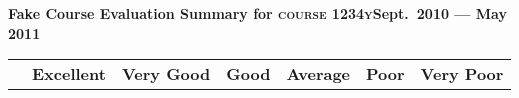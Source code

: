 \documentclass[12pt, oneside, landscape]{memoir}
\newcommand{\cheading}[2]{\textbf{#1\hfill #2}}
\newcommand{\cheading}[2]{\textcolor{Maroon}{\textbf{#1\hfill #2}}}
\begin{document}
\thispagestyle{empty}
\parindent0pt
%

\cheading{Fake Course Evaluation Summary for \textsc{course
		1234y}}{Sept.\ 2010 --- May 2011}

\begin{longtable}{@{}l rr rr rr rr rr rr}

	\toprule%
	\centering%
	                                             & \multicolumn{2}{c}{{{\bfseries Excellent}}}
	                                             & \multicolumn{2}{c}{{{\bfseries Very Good}}}
	                                             & \multicolumn{2}{c}{{{\bfseries Good}}}
	                                             & \multicolumn{2}{c}{{{\bfseries Average}}}
	                                             & \multicolumn{2}{c}{{{\bfseries Poor}}}
	                                             & \multicolumn{2}{c}{{{\bfseries Very Poor}}} \

	\cmidrule[0.4pt](r{0.125em}){1-1}%
	\cmidrule[0.4pt](lr{0.125em}){2-3}%
	\cmidrule[0.4pt](lr{0.125em}){4-5}%
	\cmidrule[0.4pt](lr{0.125em}){6-7}%
	\cmidrule[0.4pt](lr{0.125em}){8-9}%
	\cmidrule[0.4pt](lr{0.125em}){10-11}%
	\cmidrule[0.4pt](l{0.25em}){12-13}%
	\endhead


\end{longtable}
\end{document}
